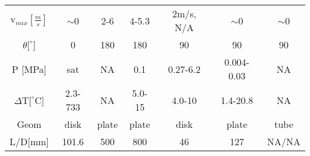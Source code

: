 \documentclass[12pt,fleqn]{report}
\begin{document}
{\begin{sidewaystable}[hp]
\begin{minipage}{9.0in}
\begin{center}
\begin{tabular}{*{7}{c}}
$\mbox{v}_{mix} \left[\frac{m}{s} \right]$ & $\sim$0 & 2-6 & 4-5.3 & 2m/s, N/A & $\sim$0 & $\sim$0\\ 
$\theta [^{\circ}$] & 0 & 180 & 180 & 90 & 90 & 90\\ 
P [MPa] & sat & NA & 0.1 & 0.27-6.2 & 0.004-0.03 & NA\\ 
$\Delta \mbox{T}[^{\circ}$C] & 2.3-733 & NA & 5.0-15 & 4.0-10 & 1.4-20.8 & NA\\ 
Geom & disk & plate & plate & disk & plate & tube\\ 
L/D[mm] & 101.6 & 500 & 800 & 46 & 127 & NA/NA\\  [2mm] \hline
\end{tabular}

\end{center}
\end{minipage}
\end{sidewaystable}
}
\end{document}
